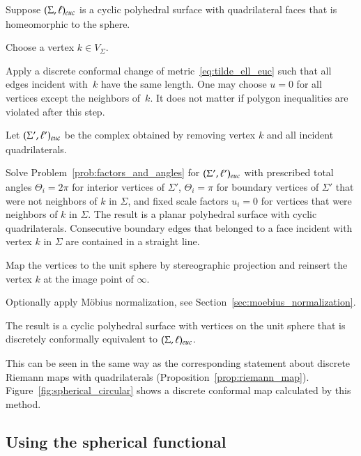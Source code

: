 \documentclass[Thesis]{subfiles}
\begin{document}
Suppose $(\Sigma,\ell)_{\euc}$ is a cyclic polyhedral surface with
quadrilateral faces that is homeomorphic to the sphere.
\begin{compactenum}[(1)]
\item Choose a vertex $k\in V_{\Sigma}$.
\item Apply a discrete conformal change of
  metric~\eqref{eq:tilde_ell_euc} such that all edges incident
  with~$k$ have the same length. One may choose $u=0$ for all
  vertices except the neighbors of~$k$. It does not matter if polygon
  inequalities are violated after this step. 
\item Let $(\Sigma',\ell')_{\euc}$ be the complex obtained by removing
  vertex $k$ and all incident quadrilaterals.
\item Solve Problem~\ref{prob:factors_and_angles} for
  $(\Sigma',\ell')_{\euc}$ with prescribed total angles
  $\Theta_i=2\pi$ for interior vertices of $\Sigma'$, $\Theta_i=\pi$
  for boundary vertices of $\Sigma'$ that were not neighbors of $k$ in
  $\Sigma$, and fixed scale factors $u_i=0$ for vertices that were
  neighbors of $k$ in $\Sigma$.  The result is a planar polyhedral
  surface with cyclic quadrilaterals. Consecutive boundary edges
  that belonged to a face incident with vertex $k$ in $\Sigma$ are
  contained in a straight line.
\item Map the vertices to the unit sphere by stereographic projection
  and reinsert the vertex $k$ at the image point of $\infty$.
\item Optionally apply M{\"o}bius normalization, see Section~\ref{sec:moebius_normalization}. 
\end{compactenum} 

\begin{proposition}
  The result is a cyclic polyhedral surface with vertices on the unit
  sphere that is discretely conformally equivalent to $(\Sigma,
  \ell)_{\euc}$.
\end{proposition}

This can be seen in the same way as the corresponding statement about
discrete Riemann maps with quadrilaterals
(Proposition~\ref{prop:riemann_map}). Figure~\ref{fig:spherical_circular}
shows a discrete conformal map  calculated by this method.


\subsection{Using the spherical functional}
\label{sec:spherical_computation}
\end{document}
